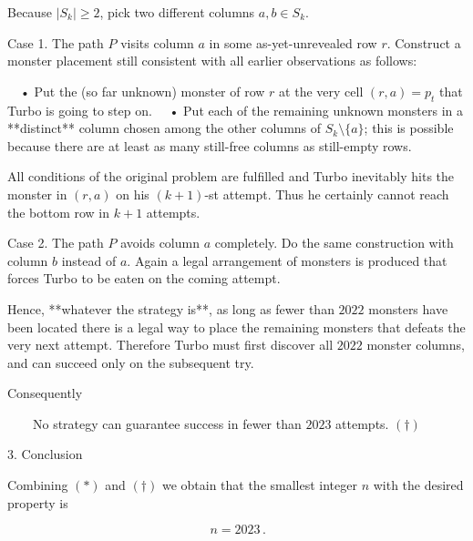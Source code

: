 Because \(|S_k|\ge 2\), pick two different columns  
\(a,b\in S_k\).

Case 1.  The path \(P\) visits column \(a\) in some as-yet-unrevealed row
\(r\).  
Construct a monster placement still consistent with all earlier observations as
follows:

 • Put the (so far unknown) monster of row \(r\) at the very cell \((r,a)=p_t\)
  that Turbo is going to step on.  
 • Put each of the remaining unknown monsters in a **distinct** column chosen
  among the other columns of \(S_k\setminus\{a\}\); this is possible because
  there are at least as many still-free columns as still-empty rows.  

All conditions of the original problem are fulfilled and Turbo
inevitably hits the monster in \((r,a)\) on his \((k+1)\)-st attempt.  
Thus he certainly cannot reach the bottom row in \(k+1\) attempts.

Case 2.  The path \(P\) avoids column \(a\) completely.
Do the same construction with column \(b\) instead of \(a\).
Again a legal arrangement of monsters is produced that forces Turbo to be
eaten on the coming attempt.

Hence, **whatever the strategy is**, as long as fewer than \(2022\) monsters
have been located there is a legal way to place the remaining monsters that
defeats the very next attempt.  Therefore Turbo must first
discover all \(2022\) monster columns,
and can succeed only on the subsequent try.

Consequently

  No strategy can guarantee success in fewer than \(2023\) attempts.       \((\dagger )\)



3.  Conclusion  

Combining \((\ast )\) and \((\dagger )\) we obtain that the smallest integer
\(n\) with the desired property is

\[
\boxed{\,n=2023\,}.
\]